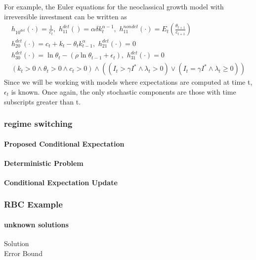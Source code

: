 \documentclass[12pt]{article}
\begin{document}
For example, the Euler equations for the  neoclassical growth  model with
irreversible investment
\label{sec:simple-rbc-model-ext} can be written as
\begin{gather}
h_{10^{det}}(\cdot)=\frac{1}{c_t},\,\,
h_{11}^{det}()=\alpha \delta k_{t}^{\alpha-1} ,\,\,
h_{11}^{nondet}(\cdot)=E_t \left (\frac{\theta_{t+1}}{c_{t+1}} \right )\\
h_{20}^{det}(\cdot)=c_t + k_t-\theta_tk_{t-1}^\alpha,\,\,
h_{21}^{det}(\cdot)=0\\
h_{30}^{det}(\cdot)=\ln \theta_t -(\rho \ln \theta_{t-1} + \epsilon_t),\,\,
h_{31}^{det}(\cdot)=0\\
(k_t>0\land\theta_t>0\land c_t>0) \land
( (I_t>\gamma I^\ast \land \lambda_t>0)\lor (I_t=\gamma I^\ast \land \lambda_t\ge0))
\end{gather}
Since we will be working with models where expectations are computed at time t, $\epsilon_t$ is known.  Once again, the only stochastic components are those with time subscripts greater than t.

\subsubsection{regime switching}
\label{sec:regime}

\paragraph{Proposed Conditional Expectation}

\paragraph{Deterministic Problem}

\paragraph{Conditional Expectation Update}


\subsubsection{RBC Example}
\label{sec:generalRBCExample}

\paragraph{unknown solutions}
\begin{description}
\item[Solution]
\item[Error Bound]
\end{description}
\end{document}
